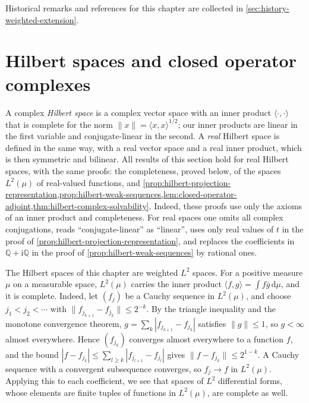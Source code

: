 Historical remarks and references for this chapter are collected in \cref{sec:history-weighted-extension}.

\section{Hilbert spaces and closed operator complexes}
\label{sec:hilbert-operator-complexes}

A complex \emph{Hilbert space} is a complex vector space with an inner product $\langle\cdot,\cdot\rangle$ that is complete for the norm $\|x\|=\langle x,x\rangle^{1/2}$; our inner products are linear in the first variable and conjugate-linear in the second. A \emph{real} Hilbert space is defined in the same way, with a real vector space and a real inner product, which is then symmetric and bilinear. All results of this section hold for real Hilbert spaces, with the same proofs: the completeness, proved below, of the spaces $L^2(\mu)$ of real-valued functions, and \cref{prop:hilbert-projection-representation,prop:hilbert-weak-sequences,lem:closed-operator-adjoint,thm:hilbert-complex-solvability}. Indeed, these proofs use only the axioms of an inner product and completeness. For real spaces one omits all complex conjugations, reads ``conjugate-linear'' as ``linear'', uses only real values of $t$ in the proof of \cref{prop:hilbert-projection-representation}, and replaces the coefficients in $\mathbb Q+\mathrm i\mathbb Q$ in the proof of \cref{prop:hilbert-weak-sequences} by rational ones.

The Hilbert spaces of this chapter are weighted $L^2$ spaces. For a positive measure $\mu$ on a measurable space, $L^2(\mu)$ carries the inner product $\langle f,g\rangle=\int f\bar g\,\mathrm d\mu$, and it is complete. Indeed, let $(f_j)$ be a Cauchy sequence in $L^2(\mu)$, and choose $j_1<j_2<\cdots$ with $\|f_{j_{k+1}}-f_{j_k}\|\le2^{-k}$. By the triangle inequality and the monotone convergence theorem, $g=\sum_k|f_{j_{k+1}}-f_{j_k}|$ satisfies $\|g\|\le1$, so $g<\infty$ almost everywhere. Hence $(f_{j_k})$ converges almost everywhere to a function $f$, and the bound $|f-f_{j_k}|\le\sum_{l\ge k}|f_{j_{l+1}}-f_{j_l}|$ gives $\|f-f_{j_k}\|\le2^{1-k}$. A Cauchy sequence with a convergent subsequence converges, so $f_j\to f$ in $L^2(\mu)$. Applying this to each coefficient, we see that spaces of $L^2$ differential forms, whose elements are finite tuples of functions in $L^2(\mu)$, are complete as well.

